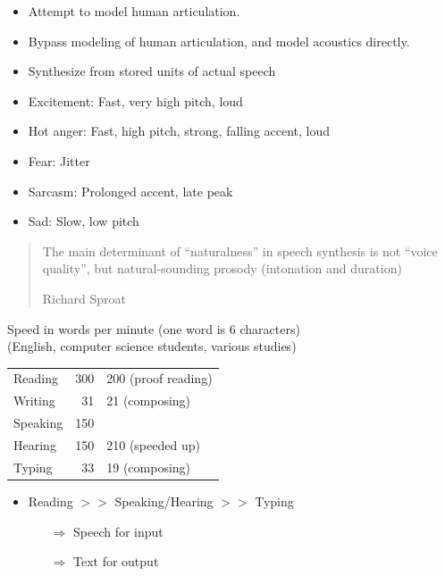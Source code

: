 \documentclass[a4paper,landscape,headrule,footrule,xetex]{foils}
\begin{document}
  \begin{itemize}
  \item {} Attempt to model human articulation.
  \item {} Bypass modeling of human articulation, and model acoustics directly.
  \item {} Synthesize from stored units of actual speech
  \end{itemize}
  

\begin{itemize}
\item Excitement: Fast, very high pitch, loud
\item Hot anger: Fast, high pitch, strong, falling accent, loud
\item Fear: Jitter
\item Sarcasm: Prolonged accent, late peak
\item Sad: Slow, low pitch
\end{itemize}

\begin{quote}
  The main determinant of ``naturalness'' in speech synthesis is not
  ``voice quality'', but natural-sounding prosody (intonation and
  duration) 
  \begin{flushright}
    Richard Sproat
  \end{flushright}
\end{quote}




Speed in words per minute (one word is 6 characters)
\\ (English, computer science students, various studies)

\begin{tabular}{lrl}
  Reading            & 300 & 200 (proof reading)\\
  Writing              & 31 & 21 (composing) \\ 
  Speaking             & 150 & \\
  Hearing              & 150 & 210 (speeded up)  \\
  Typing               & 33  & 19 (composing) 
\end{tabular}
\begin{itemize}
\item Reading $>>$ Speaking/Hearing $>>$ Typing
  \begin{itemize}
  \item[$\Rightarrow$] Speech for input
  \item[$\Rightarrow$] Text for output
  \end{itemize}
\end{itemize}
\end{document}
